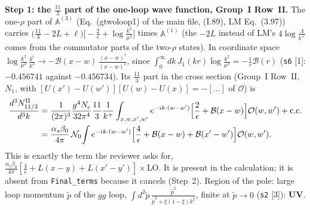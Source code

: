 \documentclass[10pt]{article}
\def\mf#1{\mathbb{#1}}
\begin{document}
\noindent\textbf{Step 1: the $\frac{11}{3}$ part of the one-loop wave function, Group~I Row~II.} The one-$\rho$ part of $\mf{A}^{(3)}$ (Eq.~(gtwoloop1) of the main file, (I.89), LM Eq.~(3.97)) carries $\big(\frac{11}{3}-2L+\ell\big)\big[-\frac{2}{\epsilon}+\log\frac{k^{2}}{\mu^{2}}\big]$ times $\mf{A}^{(1)}$ (the $-2L$ instead of LM's $4\log\frac{\Lambda}{k^{+}}$ comes from the commutator parts of the two-$\rho$ states). In coordinate space $\log\frac{k^{2}}{\mu^{2}}\,\frac{k^{i}}{k^{2}}\to-\mathcal{B}(x-w)\,\frac{(x-w)^{i}}{(x-w)^{2}}$, since $\int_{0}^{\infty}dk\,J_{1}(kr)\log\frac{k^{2}}{\mu^{2}}=-\frac{1}{r}\mathcal{B}(r)$ (\texttt{s6} [1]: $-0.456741$ against $-0.456734$). Its $\frac{11}{3}$ part in the cross section (Group~I Row~II, $N_{1}$, with $[U(x')-U(w')][U(w)-U(x)]=-[\dots]$ of $\mathcal{O}$) is
\begin{align}
\frac{d^{3}N^{\rm II}_{11/3}}{d^{3}k}&=\frac{1}{(2\pi)^{3}}\frac{g^{4}N_{c}}{32\pi^{4}}\frac{11}{3}\frac{1}{k^{+}}\int_{x,w,x',w'}e^{-ik\cdot(w-w')}\Big[\frac{2}{\epsilon}+\mathcal{B}(x-w)\Big]\mathcal{O}(w,w')+{\rm c.c.}\notag\\
&=\frac{\alpha_{s}\beta_{0}}{4\pi}\,\mathcal{N}_{0}\!\int e^{-ik\cdot(w-w')}\Big[\frac{4}{\epsilon}+\mathcal{B}(x-w)+\mathcal{B}(x'-w')\Big]\mathcal{O}(w,w').
\label{eq:pd-II}
\end{align}
This is exactly the term the reviewer asks for, $\frac{\alpha_{s}\beta_{0}}{4\pi}[\frac{4}{\epsilon}+L(x-y)+L(x'-y')]\times$LO. It is present in the calculation; it is absent from \texttt{Final\_terms} because it cancels (Step~2). Region of the pole: large loop momentum $\tilde p$ of the $gg$ loop, $\int d^{2}\tilde p\,\frac{\tilde p^{2}}{\tilde p^{2}+\xi(1-\xi)k^{2}}$, finite at $\tilde p\to0$ (\texttt{s2} [3]): \textbf{UV}.
\end{document}
